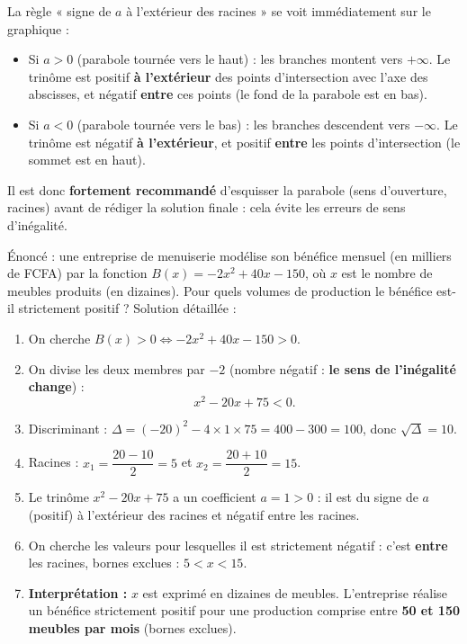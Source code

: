 \documentclass[11pt]{article}
\begin{document}
\begin{savaistu}
La règle « signe de $a$ à l'extérieur des racines » se voit immédiatement sur le graphique :
\begin{itemize}
    \item Si $a > 0$ (parabole tournée vers le haut) : les branches montent vers $+\infty$. Le trinôme est positif \textbf{à l'extérieur} des points d'intersection avec l'axe des abscisses, et négatif \textbf{entre} ces points (le fond de la parabole est en bas).
    \item Si $a < 0$ (parabole tournée vers le bas) : les branches descendent vers $-\infty$. Le trinôme est négatif \textbf{à l'extérieur}, et positif \textbf{entre} les points d'intersection (le sommet est en haut).
\end{itemize}
Il est donc \textbf{fortement recommandé} d'esquisser la parabole (sens d'ouverture, racines) avant de rédiger la solution finale : cela évite les erreurs de sens d'inégalité.
\end{savaistu}

\begin{exoresolu}
Énoncé : une entreprise de menuiserie modélise son bénéfice mensuel (en milliers de FCFA) par la fonction $B(x) = -2x^2 + 40x - 150$, où $x$ est le nombre de meubles produits (en dizaines). Pour quels volumes de production le bénéfice est-il strictement positif ?
\tcblower
Solution détaillée :
\begin{enumerate}
    \item On cherche $B(x) > 0 \iff -2x^2+40x-150 > 0$.
    \item On divise les deux membres par $-2$ (nombre négatif : \textbf{le sens de l'inégalité change}) :
    \[ x^2 - 20x + 75 < 0. \]
    \item Discriminant : $\Delta = (-20)^2 - 4\times 1 \times 75 = 400 - 300 = 100$, donc $\sqrt{\Delta}=10$.
    \item Racines : $x_1 = \dfrac{20-10}{2}=5$ et $x_2 = \dfrac{20+10}{2}=15$.
    \item Le trinôme $x^2-20x+75$ a un coefficient $a=1>0$ : il est du signe de $a$ (positif) à l'extérieur des racines et négatif entre les racines.
    \item On cherche les valeurs pour lesquelles il est strictement négatif : c'est \textbf{entre} les racines, bornes exclues : $5 < x < 15$.
    \item \textbf{Interprétation :} $x$ est exprimé en dizaines de meubles. L'entreprise réalise un bénéfice strictement positif pour une production comprise entre \textbf{50 et 150 meubles par mois} (bornes exclues).
\end{enumerate}
\end{exoresolu}
\end{document}
